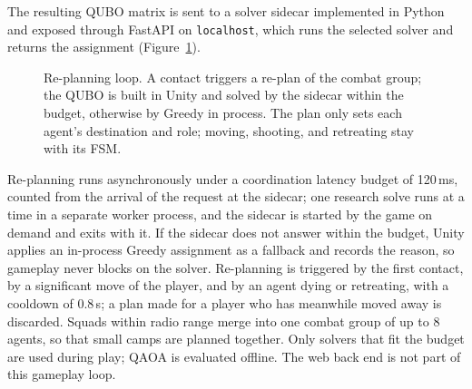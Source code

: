 \documentclass[12pt, a4paper]{article}
\begin{document}
The resulting QUBO matrix is sent to a solver sidecar implemented in Python and exposed through FastAPI on \texttt{localhost}, which runs the selected solver and returns the assignment (Figure~\ref{fig:architecture}).

\begin{figure}[htbp]
\centering
{}
\caption{Re-planning loop. A contact triggers a re-plan of the combat group; the QUBO is built in Unity and solved by the sidecar within the budget, otherwise by Greedy in process. The plan only sets each agent's destination and role; moving, shooting, and retreating stay with its FSM.}
\label{fig:architecture}
\end{figure}

Re-planning runs asynchronously under a coordination latency budget of 120\,ms, counted from the arrival of the request at the sidecar; one research solve runs at a time in a separate worker process, and the sidecar is started by the game on demand and exits with it. If the sidecar does not answer within the budget, Unity applies an in-process Greedy assignment as a fallback and records the reason, so gameplay never blocks on the solver. Re-planning is triggered by the first contact, by a significant move of the player, and by an agent dying or retreating, with a cooldown of 0.8\,s; a plan made for a player who has meanwhile moved away is discarded. Squads within radio range merge into one combat group of up to 8 agents, so that small camps are planned together. Only solvers that fit the budget are used during play; QAOA is evaluated offline. The web back end is not part of this gameplay loop.
\end{document}
